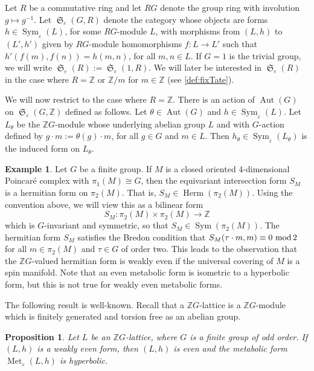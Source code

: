 \documentclass[11pt,a4paper,leqno]{amsart}
\newtheorem{proposition}[theorem]{Proposition}
\theoremstyle{definition}
\newtheorem{example}[theorem]{Example}
\theoremstyle{remark}
\newcommand{\Z}{\mathbb{Z}}
\renewcommand{\mod}{\,\,\text{\normalfont mod}\,}
\DeclareMathOperator{\Aut}{Aut}
\DeclareMathOperator{\Herm}{Herm}
\newcommand{\bZ}{\mathbb Z}
\newcommand{\ZG}{\bZ G}
\newcommand{\RG}{R G}
\DeclareMathOperator{\Met}{Met}
\newcommand{\ep}{\varepsilon}
\DeclareMathOperator{\Sym}{Sym}
\DeclareMathOperator{\SymCat}{\mathfrak{S}}
\begin{document}
 Let $R$ be a commutative ring and let $R G$ denote the group ring with involution $g \mapsto g^{-1}$. Let $\SymCat_\ep(G, R)$ denote the category whose objects are forms $h \in \Sym_\ep(L)$, for some $\RG$-module $L$, with morphisms from $(L,h)$ to $(L',h')$ given by $\RG$-module homomorphisms $f \colon L \to L'$ such that $h'(f(m), f(n)) = h(m,n)$, for all $m,n \in L$.  If $G = 1$ is the trivial group, we will write $\SymCat_\ep(R) := \SymCat_\ep(1, R)$.
 We will later be interested in $\SymCat_\ep(R)$ in the case where $R = \Z$ or $\Z/m$ for $m \in \Z$ (see \cref{def:fixTate}).

 We will now restrict to the case where $R = \Z$.
There is an action of $\Aut(G)$ on $\SymCat_\ep(G, \Z)$ defined as follows. Let $\theta \in \Aut(G)$ and $h \in \Sym_\ep(L)$. Let $L_\theta$ be the $\Z G$-module whose underlying abelian group $L$ and with $G$-action defined by $g\cdot m := \theta(g)\cdot m$, for all $g \in G$ and $m \in L$. Then $h_\theta \in \Sym_\ep(L_\theta)$ is the induced form on $L_\theta$. 
 
\begin{example} \label{example:intform}
Let $G$ be a finite group. If $M$ is a closed oriented $4$-dimensional Poincar\'{e} complex with $\pi_1(M) \cong G$, then the equivariant intersection form $S_M$ is a hermitian form on $\pi_2(M)$. That is, $S_M \in \Herm(\pi_2(M))$. Using the convention above, we will view this as a bilinear form
\[ S_M\colon \pi_2(M) \times \pi_2(M) \to \Z \]
which is $G$-invariant and symmetric, so that $S_M \in \Sym(\pi_2(M))$.
The hermitian form $S_M$ satisfies the Bredon condition  \cite[Theorem 7.4]{Bredon:1972} that $S_M(\tau \cdot m,m) \equiv 0 \mod 2$ for all $m \in \pi_2(M)$ and $\tau \in G$ of order two. This leads to the observation that the $\Z G$-valued hermitian form is weakly even 
if  the universal covering of $M$ is a spin manifold. Note that an even metabolic form is isometric to a hyperbolic form, but this is not true for weakly even metabolic forms.
\end{example}

The following result is well-known.  Recall that a $\Z G$-lattice is a $\Z G$-module which is finitely generated and torsion free as an abelian group.

\begin{proposition}\label{prop:oddmetabolic}
Let $L$ be an $\ZG$-lattice, where $G$ is a finite group of odd order.  If $(L,h)$ is a weakly even form, then $(L,h)$ is even and the metabolic form $\Met_\ep(L, h)$ is hyperbolic.
\end{proposition}
\end{document}
